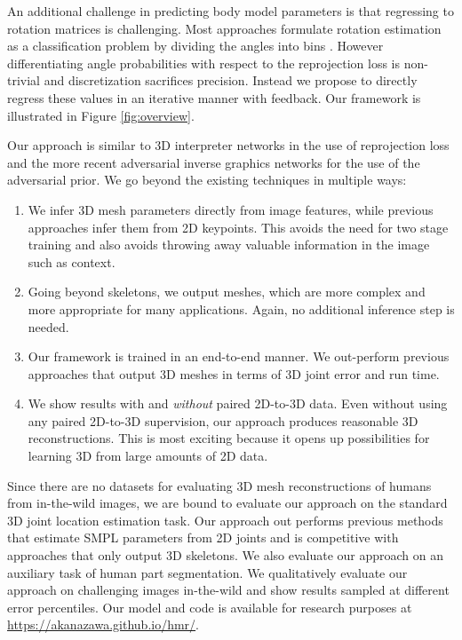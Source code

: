 \documentclass[10pt,twocolumn,letterpaper]{article}
\begin{document}
An additional challenge in predicting body model parameters is that
regressing to rotation matrices is challenging. 
Most approaches formulate rotation estimation as a classification problem
by dividing the angles into bins \cite{VPKP}. However differentiating angle
probabilities with respect to the reprojection loss is non-trivial and
discretization sacrifices precision. Instead we propose to directly regress these values in an iterative manner with feedback. Our framework is illustrated in Figure \ref{fig:overview}.

Our approach is similar to 3D interpreter networks \cite{Pavlakos,3dinterpreter} in the use of reprojection
loss and the more recent adversarial inverse graphics networks \cite{Fish2017}
for the use of the adversarial prior.
We go beyond the existing techniques in multiple ways:
\begin{enumerate}
\item We infer 3D mesh parameters directly from
image features, while previous approaches infer them from 2D keypoints. This
avoids the need for two stage training and also avoids throwing away valuable
information in the image such as context.

\item Going beyond skeletons, we output meshes, which are more complex 
  and more appropriate for many applications. Again, no additional
  inference step is needed.
\item Our framework is trained in an end-to-end manner. We out-perform
  previous approaches that output 3D meshes \cite{SMPLify,UP} in terms of 3D
  joint error and run time.
\item We show results with and \emph{without} paired 2D-to-3D data. Even without
  using any paired 2D-to-3D supervision, our approach produces reasonable 3D
  reconstructions. This is most exciting because it opens up possibilities for
  learning 3D from large amounts of 2D data.
\end{enumerate}

Since there are no datasets for evaluating 3D mesh reconstructions
of humans from in-the-wild images, we are bound to evaluate our
approach on the standard 3D joint location estimation task. Our
approach out performs previous methods that estimate SMPL parameters from 2D
joints and is competitive with approaches that only output 3D skeletons. We
also evaluate our approach on an auxiliary task of human part segmentation. We
qualitatively evaluate our approach on challenging images in-the-wild and show
results sampled at different error percentiles. Our model and code
is available for research purposes at \url{https://akanazawa.github.io/hmr/}.
\end{document}
